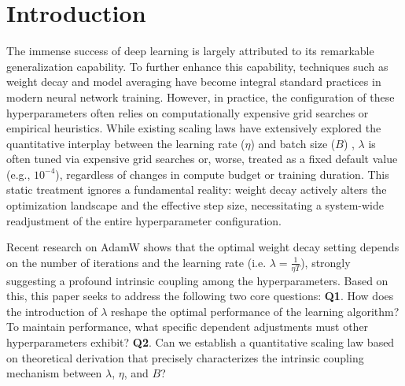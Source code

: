 \section{Introduction}
The immense success of deep learning is largely attributed to its remarkable generalization capability. To further enhance this capability, techniques such as weight decay \cite{doi:10.1137/0109031,Hoerl,a92f3c16-7c6e-31d3-b403-82d2b0a469e4,10.5555/2986916.2987033} and model averaging \cite{szegedy2016rethinking,izmailov2018averaging} have become integral standard practices in modern neural network training. However, in practice, the configuration of these hyperparameters often relies on computationally expensive grid searches or empirical heuristics. While existing scaling laws have extensively explored the quantitative interplay between the learning rate ($\eta$) \cite{zhou2026setlearningratelargescale} and batch size ($B$) \cite{mccandlish2018empiricalmodellargebatchtraining,zhou2026setbatchsizelargescale}, $\lambda$ is often tuned via expensive grid searches or, worse, treated as a fixed default value (e.g., $10^{-4}$), regardless of changes in compute budget or training duration. This static treatment ignores a fundamental reality: weight decay actively alters the optimization landscape and the effective step size, necessitating a system-wide readjustment of the entire hyperparameter configuration.

Recent research \cite{wang2025setadamwsweightdecay} on AdamW shows that the optimal weight decay setting depends on the number of iterations and the learning rate (i.e. $\lambda=\frac{1}{\eta T}$), strongly suggesting a profound intrinsic coupling among the hyperparameters. Based on this, this paper seeks to address the following two core questions: \textbf{Q1}. How does the introduction of $\lambda$ reshape the optimal performance of the learning algorithm? To maintain performance, what specific dependent adjustments must other hyperparameters exhibit? \textbf{Q2}. Can we establish a quantitative scaling law based on theoretical derivation that precisely characterizes the intrinsic coupling mechanism between $\lambda$, $\eta$, and $B$? 


